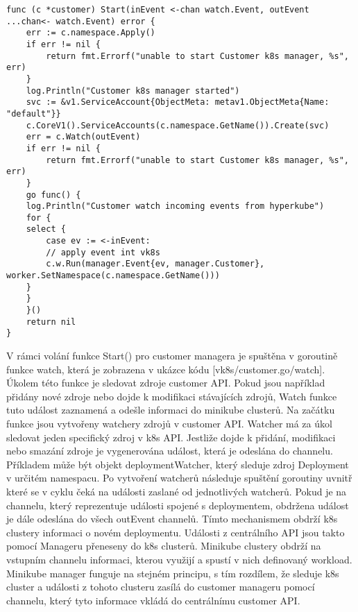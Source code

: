 \begin{lstlisting}[caption=funkce Start Customer managera]
func (c *customer) Start(inEvent <-chan watch.Event, outEvent ...chan<- watch.Event) error {
	err := c.namespace.Apply()
	if err != nil {
		return fmt.Errorf("unable to start Customer k8s manager, %s", err)
	}
	log.Println("Customer k8s manager started")
	svc := &v1.ServiceAccount{ObjectMeta: metav1.ObjectMeta{Name: "default"}}
	c.CoreV1().ServiceAccounts(c.namespace.GetName()).Create(svc)
	err = c.Watch(outEvent)
	if err != nil {
		return fmt.Errorf("unable to start Customer k8s manager, %s", err)
	}
	go func() {
	log.Println("Customer watch incoming events from hyperkube")
	for {
	select {
		case ev := <-inEvent:
		// apply event int vk8s
		c.w.Run(manager.Event{ev, manager.Customer}, worker.SetNamespace(c.namespace.GetName()))
	}
	}
	}()
	return nil
}
\end{lstlisting}
\par																																					    V rámci volání funkce Start() pro customer managera je spuštěna v goroutině funkce watch, která je zobrazena v ukázce kódu [vk8s/customer.go/watch]. Úkolem této funkce je sledovat zdroje customer API. Pokud jsou například přidány nové zdroje nebo dojde k modifikaci stávajících zdrojů, Watch funkce tuto událost zaznamená a odešle informaci do minikube clusterů. Na začátku funkce jsou vytvořeny watchery zdrojů v customer API. Watcher má za úkol sledovat jeden specifický zdroj v k8s API. Jestliže dojde k přidání, modifikaci nebo smazání zdroje je vygenerována událost, která je odeslána do channelu. Příkladem může být objekt deploymentWatcher, který sleduje zdroj Deployment v určitém namespacu. Po vytvoření watcherů následuje spuštění goroutiny uvnitř které se v cyklu čeká na události zaslané od jednotlivých watcherů. Pokud je na channelu, který reprezentuje události spojené s deploymentem, obdržena událost je dále odeslána do všech outEvent channelů. Tímto mechanismem obdrží k8s clustery informaci o novém deploymentu. Události z centrálního API jsou takto pomocí Manageru přeneseny do k8s clusterů. Minikube clustery obdrží na vstupním channelu informaci, kterou využijí a spustí v nich definovaný workload. Minikube manager funguje na stejném principu, s tím rozdílem, že sleduje k8s cluster a události z tohoto clusteru zasílá do customer manageru pomocí channelu, který tyto informace vkládá do centrálnímu customer API. 

